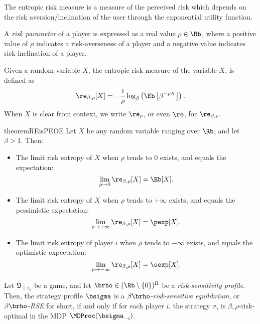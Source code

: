 The entropic risk measure is a measure of the perceived risk which depends on the risk aversion/inclination of the user through the exponential utility function. 

A \emph{risk parameter} of a player is expressed as a real value $\rho\in\Rb$, where a positive value of $\rho$ indicates a risk-averseness of a player and a negative value indicates risk-inclination of a player.

\begin{definition}
Given a random variable $X$, the entropic risk measure of the variable $X$, is defined as 
$$\re_{\beta,\rho}[X] = -\frac{1}{\rho} \log_\beta \left( \Eb \left[ \beta^{-\rho X}\right] \right).$$
When $X$ is clear from context, we write $\re_\rho$, or even $\re$, for $\re_{\beta,\rho}$.
\end{definition}

\begin{restatable}{theorem}{REisPEOE}\label{thm:RE=PEorOE}
    Let $X$ be any random variable ranging over $\Rb$, and let $\beta > 1$.
    Then:
    \begin{itemize}
        \item The limit risk entropy of $X$ when $\rho$ tends to $0$ exists, and equals the expectation:
        $$\lim_{\rho \to 0} \re_{\beta,\rho} [X] = \Eb[X].$$
        
        \item The limit risk entropy of $X$ when $\rho$ tends to $+\infty$ exists, and equals the pessimistic expectation:
        $$\lim_{\rho \to +\infty} \re_{\beta,\rho} [X] = \pexp[X].$$
        
        \item The limit risk entropy of player $i$ when $\rho$ tends to $-\infty$ exists, and equals the optimistic expectation:
        $$\lim_{\rho \to -\infty} \re_{\beta,\rho} [X] = \oexp[X].$$
    \end{itemize}
\end{restatable}
    


\begin{definition}
    Let $\Game_{\|v_0}$ be a game, and let $\brho \in (\Rb \setminus \{0\})^\Pi$ be a \emph{risk-sensitivity profile}.
    Then, the strategy profile $\bsigma$ is a \emph{$\beta\brho$-risk-sensitive equilibrium}, or \emph{$\beta\brho$-RSE} for short, if and only if for each player $i$, the strategy $\sigma_i$ is $\beta,\rho$-risk-optimal in the MDP $\MDProc(\bsigma_{-i})$.
\end{definition}


